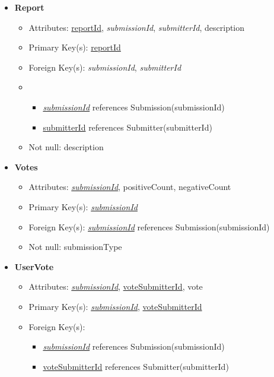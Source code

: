 \begin{itemize}
        \item \textbf{Report}
        \begin{itemize}
            \item Attributes: \underline{reportId}, \textit{submissionId}, \textit{submitterId}, description
            \item Primary Key(s): \underline{reportId}
            \item Foreign Key(s): \textit{submissionId}, \textit{submitterId}
            \item \begin{itemize}
                \item \underline{\textit{submissionId}} references Submission(submissionId)
                \item \underline{submitterId} references Submitter(submitterId)
            \end{itemize} 
            \item Not null: description
        \end{itemize}

        \item \textbf{Votes}
        \begin{itemize}
            \item Attributes: \underline{\textit{submissionId}}, positiveCount, negativeCount
            \item Primary Key(s): \underline{\textit{submissionId}}
            \item Foreign Key(s): \underline{\textit{submissionId}} references Submission(submissionId)
            \item Not null: submissionType
        \end{itemize}

        \item \textbf{UserVote}
        \begin{itemize}
            \item Attributes: \underline{\textit{submissionId}}, \underline{voteSubmitterId}, vote
            \item Primary Key(s): \underline{\textit{submissionId}}, \underline{voteSubmitterId}
            \item Foreign Key(s): 
            \begin{itemize}
                \item \underline{\textit{submissionId}} references Submission(submissionId)
                \item \underline{voteSubmitterId} references Submitter(submitterId)
            \end{itemize}
        \end{itemize}


\end{itemize}
